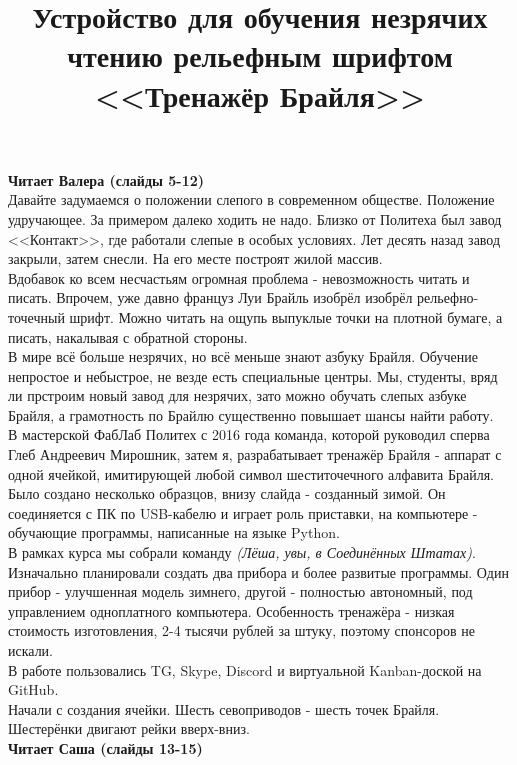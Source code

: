 \documentclass[a4paper,12pt]{article} %
\begin{document}
\title{Устройство для обучения незрячих чтению рельефным шрифтом <<Тренажёр Брайля>>}
\maketitle
\textbf{Читает Валера (слайды 5-12)}\\
Давайте задумаемся о положении слепого в современном обществе. Положение удручающее. За примером далеко ходить не надо. Близко от Политеха был завод <<Контакт>>, где работали слепые в особых условиях. Лет десять назад завод закрыли, затем снесли. На его месте построят жилой массив.\\
Вдобавок ко всем несчастьям огромная проблема - невозможность читать и писать. Впрочем, уже давно француз Луи Брайль изобрёл изобрёл рельефно-точечный шрифт. Можно читать на ощупь выпуклые точки на плотной бумаге, а писать, накалывая с обратной стороны.\\
В мире всё больше незрячих, но всё меньше знают азбуку Брайля. Обучение непростое и небыстрое, не везде есть специальные центры. Мы, студенты, вряд ли прстроим новый завод для незрячих, зато можно обучать слепых азбуке Брайля, а грамотность по Брайлю существенно повышает шансы найти работу.\\
В мастерской ФабЛаб Политех с 2016 года команда, которой руководил сперва Глеб Андреевич Мирошник, затем я, разрабатывает тренажёр Брайля - аппарат с одной ячейкой, имитирующей любой символ шеститочечного алфавита Брайля. Было создано несколько образцов, внизу слайда - созданный зимой. Он соединяется с ПК по USB-кабелю и играет роль приставки, на компьютере - обучающие программы, написанные на языке Python.\\ %
В рамках курса мы собрали команду \textit{(Лёша, увы, в Соединённых Штатах)}. Изначально планировали создать два прибора и более развитые программы. Один прибор - улучшенная модель зимнего, другой - полностью автономный, под управлением одноплатного компьютера. Особенность тренажёра - низкая стоимость изготовления, 2-4 тысячи рублей за штуку, поэтому спонсоров не искали.\\ %
В работе пользовались TG, Skype, Discord и виртуальной Kanban-доской на GitHub.\\ %
Начали с создания ячейки. Шесть севоприводов - шесть точек Брайля. Шестерёнки двигают рейки вверх-вниз. \\ %
\textbf{Читает Саша (слайды 13-15)}\\
\end{document}
